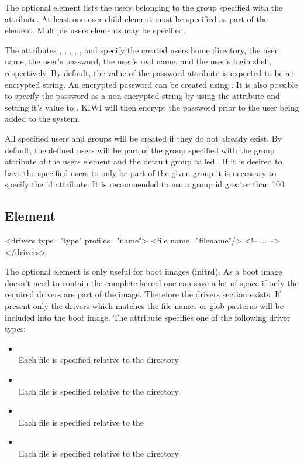 The optional  element lists the users belonging to the group specified
with the  attribute. At least one user child element must be specified
as part of the  element. Multiple users elements may be specified.

The attributes , , , , 
, and  specify the created
users home directory, the user name, the user's password, the user's 
real name, and the user's login shell, respectively. By default, the value
of the password attribute is expected to be an encrypted string. An
encrypted password can be created using  . It
is also possible to specify the password as a non encrypted string by using
the  attribute and setting it's value to . KIWI will then
encrypt the password prior to the user being added to the system.

All specified users and groups will be created if they do not already exist.
By default, the defined users will be part of the group specified with the 
group attribute of the users element and the default group called .
If it is desired to have the specified users to only be part of the given
group it is necessary to specify the id attribute. It is recommended to use
a group id greater than 100.

\subsection{ Element}
\begin{xml}
<drivers type="type" profiles="name">
  <file name="filename"/>
  <!-- ... -->
</drivers>
\end{xml}

The optional  element is only useful for boot images (initrd).
As a boot image doesn't need to contain the complete kernel one can
save a lot of space if only the required drivers are part of the image.
Therefore the drivers section exists. If present only the drivers which
matches the file names or glob patterns will be included into the
boot image. The  attribute specifies one of the following driver
types:

\begin{itemize}
\item {}\\
      Each file is specified relative to the
       directory.
\item {}\\
      Each file is specified relative to the
      directory.
\item {}\\
      Each file is specified relative to the
\item {}\\
      Each file is specified relative to the
       directory.
\end{itemize}

